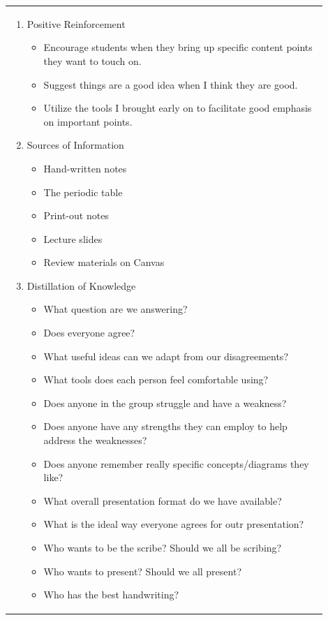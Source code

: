\documentclass{article}
\begin{document}
\begin{flushleft}
\begin{tabular}{|p{0.9\linewidth}|}
\begin{enumerate}[label=\arabic*.]
    \item {Positive Reinforcement}
	\begin{itemize}
            \item Encourage students when they bring up specific content points they want to touch on.
	    \item Suggest things are a good idea when I think they are good.
	    \item Utilize the tools I brought early on to facilitate good emphasis on important points.
        \end{itemize}
    \item {Sources of Information}
        \begin{itemize}
	    \item Hand-written notes
	    \item The periodic table
	    \item Print-out notes
	    \item Lecture slides
	    \item Review materials on Canvas
	\end{itemize}
    \item {Distillation of Knowledge}
        \begin{itemize}
	    \item What question are we answering?
	    \item Does everyone agree?
	    \item What useful ideas can we adapt from our disagreements?
	    \item What tools does each person feel comfortable using?
	    \item Does anyone in the group struggle and have a weakness?
	    \item Does anyone have any strengths they can employ to help address the weaknesses?
	    \item Does anyone remember really specific concepts/diagrams they like?
	    \item What overall presentation format do we have available?
	    \item What is the ideal way everyone agrees for outr presentation?
	    \item Who wants to be the scribe? Should we all be scribing?
	    \item Who wants to present? Should we all present?
	    \item Who has the best handwriting?
	\end{itemize}

\end{enumerate}
\end{tabular}
\end{flushleft}
\end{document}
